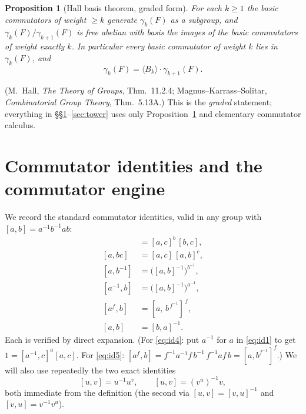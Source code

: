 \documentclass{amsart}
\newtheorem{proposition}{Proposition}
\theoremstyle{definition}
\theoremstyle{remark}
\begin{document}
\begin{proposition}[Hall basis theorem, graded form]\label{prop:hall}
For each $k\ge 1$ the basic commutators of weight $\ge k$ generate $\gamma_k(F)$
\emph{as a subgroup}, and $\gamma_k(F)/\gamma_{k+1}(F)$ is free abelian with basis
the images of the basic commutators of weight exactly $k$. In particular every
basic commutator of weight $k$ lies in $\gamma_k(F)$, and
\begin{equation}\label{eq:hall-decomp}
\gamma_k(F)=\langle B_k\rangle\cdot\gamma_{k+1}(F).
\end{equation}
\end{proposition}

\noindent(M.~Hall, \emph{The Theory of Groups}, Thm.~11.2.4;
Magnus--Karrass--Solitar, \emph{Combinatorial Group Theory}, Thm.~5.13A.) This is
the \emph{graded} statement; everything in \S\S\ref{sec:engine}--\ref{sec:tower}
uses only Proposition~\ref{prop:hall} and elementary commutator calculus.

\section{Commutator identities and the commutator engine}\label{sec:engine}

We record the standard commutator identities, valid in any group with
$[a,b]=a^{-1}b^{-1}ab$:
\begin{align}
[ab,c]&=[a,c]^{b}\,[b,c], \label{eq:id1}\\
[a,bc]&=[a,c]\,[a,b]^{c}, \label{eq:id2}\\
[a,b^{-1}]&=\big([a,b]^{-1}\big)^{b^{-1}}, \label{eq:id3}\\
[a^{-1},b]&=\big([a,b]^{-1}\big)^{a^{-1}}, \label{eq:id4}\\
[a^{f},b]&=[a,\,b^{\,f^{-1}}]^{\,f}, \label{eq:id5}\\
[a,b]&=[b,a]^{-1}. \label{eq:id6}
\end{align}
Each is verified by direct expansion. (For \eqref{eq:id4}: put $a^{-1}$ for $a$ in
\eqref{eq:id1} to get $1=[a^{-1},c]^{a}[a,c]$. For \eqref{eq:id5}:
$[a^f,b]=f^{-1}a^{-1}f\,b^{-1}\,f^{-1}af\,b=[a,b^{f^{-1}}]^{f}$.) We will also use
repeatedly the two exact identities
\begin{equation}\label{eq:conjtrick}
[u,v]=u^{-1}u^{v},\qquad [u,v]=(v^{u})^{-1}v ,
\end{equation}
both immediate from the definition (the second via $[u,v]=[v,u]^{-1}$ and
$[v,u]=v^{-1}v^{u}$).
\end{document}

